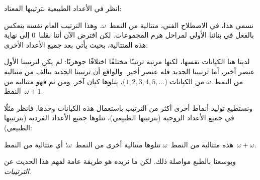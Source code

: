 \documentclass[../../../include/open-logic-section]{subfiles}
\begin{document}

انظر في الأعداد الطبيعية بترتيبها المعتاد:
\begin{center}
\end{center}
نسمي هذا، في الاصطلاح الفني، متتالية من النمط~$\omega$. وهذا الترتيب
العام نفسه ينعكس بالفعل في بنائنا الأولي لمراحل هرم المجموعات. لكن
افترض الآن أننا نقلنا~$0$ إلى نهاية هذه المتتالية، بحيث يأتي بعد جميع
الأعداد الأخرى:
\begin{center}
\end{center}
لدينا هنا الكيانات نفسها، لكنها مرتبة ترتيبًا مختلفًا اختلافًا
جوهريًا: لم يكن لترتيبنا الأول عنصر أخير، أما ترتيبنا الجديد فله عنصر
أخير. والواقع أن ترتيبنا الجديد يتألف من متتالية من النمط~$\omega$
من الكيانات ($1, 2, 3, 4, 5, \ldots$)، يتلوها كيان آخر. ومن ثم فهو
متتالية من النمط~$\omega+1$.

ونستطيع توليد أنماط أخرى أكثر من الترتيب باستعمال هذه الكيانات وحدها.
فانظر مثلًا في جميع الأعداد الزوجية (بترتيبها الطبيعي)، تتلوها جميع
الأعداد الفردية (بترتيبها الطبيعي):
\begin{center}
\end{center}
هذه متتالية من النمط~$\omega$ تتلوها متتالية أخرى من النمط~$\omega$؛
أي متتالية من النمط~$\omega+\omega$.

وبوسعنا بالطبع مواصلة ذلك. لكن ما نريده هو طريقة عامة لفهم هذا الحديث
عن \emph{الترتيبات}.
\end{document}
